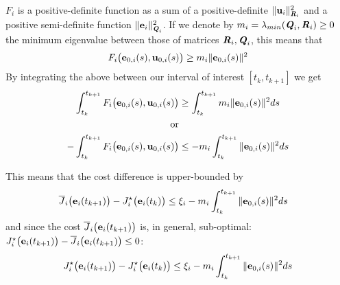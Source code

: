 \begin{gg_box}
  $F_i$ is a positive-definite function as a sum of a positive-definite
  $\|\bm{\mathbf{u}}_i\|^2_{\bm{\mathit{R}}_i}$ and a positive semi-definite function
  $\|\bm{\mathbf{e}}_i\|^2_{\bm{\mathit{Q}}_i}$. If we denote by
  $m_i = \lambda_{min}(\bm{\mathit{Q}}_i, \bm{\mathit{R}}_i) \geq 0$ the minimum eigenvalue
  between those of matrices $\bm{\mathit{R}}_i, \bm{\mathit{Q}}_i$, this means that
  \begin{align}
    F_i \big(\bm{\mathbf{e}}_{0,i}(s), \bm{\mathbf{u}}_{0,i} (s)\big) \geq m_i \|\bm{\mathbf{e}}_{0,i}(s)\|^2
  \end{align}
  By integrating the above between our interval of interest $[t_k, t_{k+1}]$ we get
  \begin{align}
    \int_{t_k}^{t_{k+1}} F_i \big(\bm{\mathbf{e}}_{0,i}(s), \bm{\mathbf{u}}_{0,i} (s)\big) &\geq \int_{t_k}^{t_{k+1}} m_i \|\bm{\mathbf{e}}_{0,i}(s)\|^2 ds \\
    \text{or}\\
    -\int_{t_k}^{t_{k+1}} F_i \big(\bm{\mathbf{e}}_{0,i}(s), \bm{\mathbf{u}}_{0,i} (s)\big) &\leq -m_i \int_{t_k}^{t_{k+1}} \|\bm{\mathbf{e}}_{0,i}(s)\|^2 ds
  \end{align}
\end{gg_box}
This means that the cost difference is upper-bounded by
\begin{align}
  \overline{J}_i\big(\bm{\mathbf{e}}_i(t_{k+1})\big) - J_i^{\star}\big(\bm{\mathbf{e}}_i(t_k)\big)
  &\leq \xi_i -m_i \int_{t_k}^{t_{k+1}} \|\bm{\mathbf{e}}_{0,i}(s)\|^2 ds
\end{align}
and since the cost $\overline{J}_i\big(\bm{\mathbf{e}}_i(t_{k+1})\big)$ is, in general,
sub-optimal: $J_i^{\star}\big(\bm{\mathbf{e}}_i(t_{k+1})\big) - \overline{J}_i\big(\bm{\mathbf{e}}_i(t_{k+1})\big) \leq 0$:
\begin{align}
 J_i^{\star}\big(\bm{\mathbf{e}}_i(t_{k+1})\big) - J_i^{\star}\big(\bm{\mathbf{e}}_i(t_k)\big) \leq \xi_i -m_i \int_{t_k}^{t_{k+1}} \|\bm{\mathbf{e}}_{0,i}(s)\|^2 ds
 \label{eq:J_opt_between_consecutive_k_2}
\end{align}


